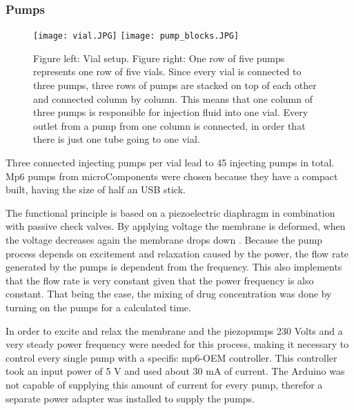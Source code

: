\subsubsection{Pumps} 
\begin{figure}
	\texttt{[image: vial.JPG]}
	\texttt{[image: pump\_blocks.JPG]}
	\caption{Figure left: Vial setup. Figure right: One row of five pumps represents one row of five vials. Since every vial is connected to three pumps, three rows of pumps are stacked on top of each other and connected column by column. This means that one column of three pumps is responsible for injection fluid into one vial. Every outlet from a pump from one column is connected, in order that there is just one tube going to one vial. }
	\label{figure:tubing_setup}
\end{figure}
Three connected injecting pumps per vial lead to 45 injecting pumps in total. Mp6 pumps from microComponents were chosen because they have a compact built, having the size of half an USB stick. 

The functional principle is based on a piezoelectric diaphragm in combination with passive check valves. By applying voltage the membrane is deformed, when the voltage decreases again the membrane drops down \cite{piezo_pumps}. Because the pump process depends on excitement and relaxation caused by the power, the flow rate generated by the pumps is dependent from the frequency. This also implements that the flow rate is very constant given that the power frequency is also constant. That being the case, the mixing of drug concentration was done by turning on the pumps for a calculated time.

In order to excite and relax the membrane and the piezopumps 230 Volts and a very steady power frequency were needed for this process, making it necessary to control every single pump with a specific mp6-OEM controller. This controller took an input power of 5 V and used about 30 mA of current. The Arduino was not capable of supplying this amount of current for every pump, therefor a separate power adapter was installed to supply the pumps. 

